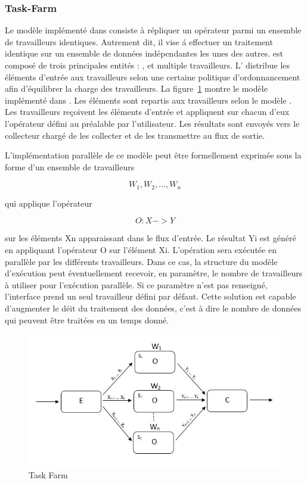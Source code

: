 \subsubsection{Task-Farm}

Le mod\`ele  impl\'ement\'e dans   consiste \`a r\'epliquer un op\'erateur parmi un ensemble de travailleurs identiques. Autrement dit, il vise \'a effectuer un traitement identique sur un ensemble de donn\'ees ind\'ependantes les unes des autres.  est compos\'e de trois principales entit\'es : ,  et multiple travailleurs. L' distribue les \'el\'ements d'entr\'ee aux travailleurs selon une certaine politique d'ordonnancement afin d'\'equilibrer la charge des travailleurs. La figure~\ref{ParallelismeTaskFarm.fig} montre le mod\`ele  impl\'ement\'e dans . Les \'el\'ements sont repartis aux travailleurs selon le mod\`ele . Les travailleurs re\c coivent les \'el\'ements d'entr\'ee et appliquent sur chacun d'eux l'op\'erateur d\'efini au pr\'ealable par l'utilisateur. Les r\'esultats sont envoy\'es vers le collecteur charg\'e de les collecter et de les transmettre au flux de sortie.

L'impl\'ementation parall\`ele de ce mod\`ele peut \^etre formellement exprim\'ee sous la forme d'un ensemble de travailleurs 

\[
	{W_1, W_2,\ldots, W_n}
\]

qui applique l'op\'erateur 

\[
	O : X -> Y
\]

sur les \'el\'ements Xn apparaissant dans le flux d'entr\'ee. Le r\'esultat Yi est g\'en\'er\'e en appliquant l'op\'erateur O sur l'\'el\'ement Xi. L'op\'eration sera ex\'ecut\'ee en parall\`ele par les diff\'erents travailleurs. Dans ce cas, la structure du mod\`ele d'ex\'ecution peut \'eventuellement recevoir, en param\`etre, le nombre de travailleurs \`a utiliser pour l'ex\'ecution parall\`ele. Si ce param\`etre n'est pas renseign\'e, l'interface prend un seul travailleur d\'efini par d\'efaut. Cette solution est capable d'augmenter le d\'eit du traitement des donn\'ees, c'est \`a dire le nombre de donn\'ees qui peuvent \^etre trait\'ees en un temps donn\'e.

\begin{figure}[ht]
\centering
     \includegraphics[width=1.0\textwidth]{Figures/ParallelismeTaskFarm.jpg}
      \caption{Task Farm}
       \label{ParallelismeTaskFarm.fig}
\end{figure}




